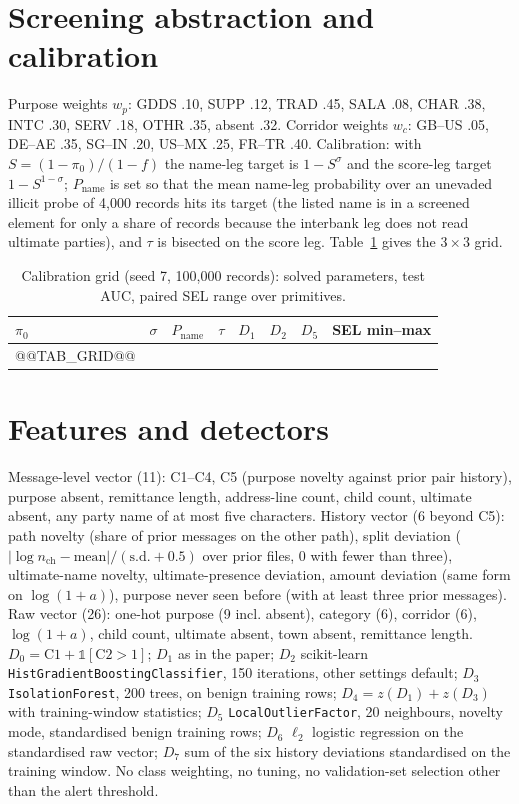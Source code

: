 \documentclass[conference]{IEEEtran}
\begin{document}
\section{Screening abstraction and calibration}
Purpose weights $w_p$: GDDS .10, SUPP .12, TRAD .45, SALA .08, CHAR .38, INTC
.30, SERV .18, OTHR .35, absent .32. Corridor weights $w_c$: GB--US .05, DE--AE
.35, SG--IN .20, US--MX .25, FR--TR .40. Calibration: with
$S=(1-\pi_0)/(1-f)$ the name-leg target is $1-S^{\sigma}$ and the score-leg
target $1-S^{1-\sigma}$; $P_{\mathrm{name}}$ is set so that the mean name-leg
probability over an unevaded illicit probe of 4,000 records hits its target
(the listed name is in a screened element for only a share of records because
the interbank leg does not read ultimate parties), and $\tau$ is bisected on
the score leg. Table~\ref{tab:grid} gives the $3\times3$ grid.
\begin{table}[t]\caption{Calibration grid (seed 7, 100,000 records): solved parameters, test AUC, paired SEL range over primitives.}\label{tab:grid}\centering\scriptsize
\begin{tabular}{@{}llcccccc@{}}\toprule
$\pi_0$ & $\sigma$ & $P_{\mathrm{name}}$ & $\tau$ & $D_1$ & $D_2$ & $D_5$ & SEL min--max \\\midrule
@@TAB_GRID@@
\bottomrule\end{tabular}\end{table}

\section{Features and detectors}
Message-level vector (11): C1--C4, C5 (purpose novelty against prior pair
history), purpose absent, remittance length, address-line count, child
count, ultimate absent, any party name of at most five characters. History
vector (6 beyond C5): path novelty (share of prior messages on the other
path), split deviation ($|\log n_{\mathrm{ch}}-\text{mean}|/(\text{s.d.}+0.5)$
over prior files, 0 with fewer than three), ultimate-name novelty,
ultimate-presence deviation, amount deviation (same form on $\log(1+a)$),
purpose never seen before (with at least three prior messages). Raw vector
(26): one-hot purpose (9 incl. absent), category (6), corridor (6),
$\log(1+a)$, child count, ultimate absent, town absent, remittance length.
$D_0=\mathrm{C1}+\mathbb{1}[\mathrm{C2}>1]$; $D_1$ as in the paper; $D_2$
scikit-learn \texttt{HistGradientBoostingClassifier}, 150 iterations, other
settings default; $D_3$ \texttt{IsolationForest}, 200 trees, on benign
training rows; $D_4=z(D_1)+z(D_3)$ with training-window statistics; $D_5$
\texttt{LocalOutlierFactor}, 20 neighbours, novelty mode, standardised benign
training rows; $D_6$ $\ell_2$ logistic regression on the standardised raw
vector; $D_7$ sum of the six history deviations standardised on the training
window. No class weighting, no tuning, no validation-set selection other
than the alert threshold.
\end{document}

